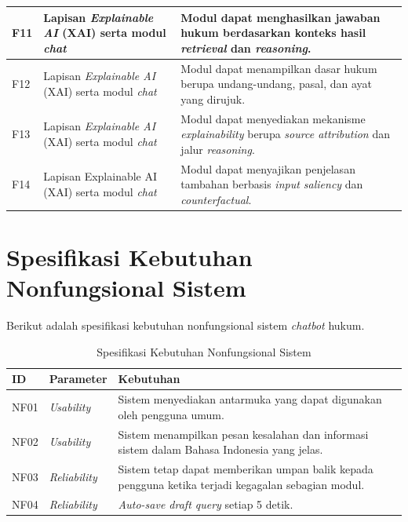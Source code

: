 {\begin{longtable}{|p{}|p{}|p{}|}
F11 & Lapisan \emph{Explainable AI} (XAI) serta modul \emph{chat} & Modul dapat menghasilkan jawaban hukum berdasarkan konteks hasil \emph{retrieval} dan \emph{reasoning}. \\\hline
F12 & Lapisan \emph{Explainable AI} (XAI) serta modul \emph{chat} & Modul dapat menampilkan dasar hukum berupa undang-undang, pasal, dan ayat yang dirujuk. \\\hline
F13 & Lapisan \emph{Explainable AI} (XAI) serta modul \emph{chat} & Modul dapat menyediakan mekanisme \emph{explainability} berupa \emph{source attribution} dan jalur \emph{reasoning}. \\\hline
F14 & Lapisan Explainable AI (XAI) serta modul \emph{chat} & Modul dapat menyajikan penjelasan tambahan berbasis \emph{input saliency} dan \emph{counterfactual}. \\\hline
\end{longtable}}

\section{Spesifikasi Kebutuhan Nonfungsional Sistem}

Berikut adalah spesifikasi kebutuhan nonfungsional sistem \emph{chatbot} hukum.

\begin{table}[H]
\centering
\caption{Spesifikasi Kebutuhan Nonfungsional Sistem}
\label{tab:nonfunctional}
\begin{tabularx}{\textwidth}{|p{}|p{}|X|}
\hline \textbf{ID} & \textbf{Parameter} & \textbf{Kebutuhan} \\\hline
NF01 & \emph{Usability} & Sistem menyediakan antarmuka yang dapat digunakan oleh pengguna umum. \\\hline
NF02 & \emph{Usability} & Sistem menampilkan pesan kesalahan dan informasi sistem dalam Bahasa Indonesia yang jelas. \\\hline
NF03 & \emph{Reliability} & Sistem tetap dapat memberikan umpan balik kepada pengguna ketika terjadi kegagalan sebagian modul. \\\hline
NF04 & \emph{Reliability} & \emph{Auto-save draft query} setiap 5 detik. \\\hline
\end{tabularx}
\end{table}

